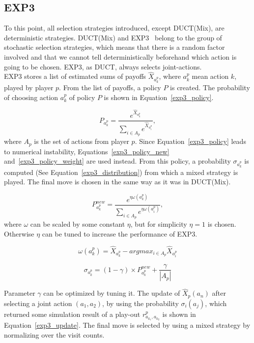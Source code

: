 \documentclass{article}
\begin{document}
\subsection{EXP3}
\label{subsec:exp3}
To this point, all selection strategies introduced, except DUCT(Mix), are deterministic strategies. DUCT(Mix) and EXP3~\cite{Teytaud11Upper} belong to the group of stochastic selection strategies, which means that there is a random factor involved and that we cannot tell deterministically beforehand which action is going to be chosen. EXP3, as DUCT, always selects joint-actions.\\
EXP3 stores a list of estimated sums of payoffs $\hat{X}_{a^{p}_{k}}$, where $a^{p}_{k}$ mean action $k$, played by player $p$. From the list of payoffs, a policy $P$ is created. The probability of choosing action $a^{p}_{k}$ of policy $P$ is shown in Equation~\ref{exp3_policy}.

\begin{equation}\label{exp3_policy}
P_{a^{p}_{k}}=\frac{e^{\hat{X}_{a^{p}_{k}}}}{\sum\limits_{i \in A_{p}}e^{\hat{X}_{a^{p}_{i}}}},
\end{equation}
where $A_{p}$ is the set of actions from player $p$. Since Equation~\ref{exp3_policy} leads to numerical instability, Equations~\ref{exp3_policy_new} and~\ref{exp3_policy_weight} are used instead. From this policy, a probability $\sigma_{a^{p}_{k}}$ is computed (See Equation~\ref{exp3_distribution}) from which a mixed strategy is played. The final move is chosen in the same way as it was in DUCT(Mix).

\begin{equation}\label{exp3_policy_new}
P^{new}_{a^{p}_{k}}=\frac{e^{\eta\omega(a^{p}_{k})}}{\sum\limits_{i \in A_{p}}e^{\eta\omega(a^{p}_{i})}},
\end{equation}
where $\omega$ can be scaled by some constant $\eta$, but for simplicity $\eta=1$ is chosen. Otherwise $\eta$ can be tuned to increase the performance of EXP3.


\begin{equation}\label{exp3_policy_weight}
\omega(a^{p}_{k})=\hat{X}_{a^{p}_{k}}-argmax_{i \in A_{p}}\hat{X}_{a^{p}_{i}}
\end{equation}

\begin{equation}\label{exp3_distribution}
\sigma_{a^{p}_{k}}=(1-\gamma) \times P^{new}_{a^{p}_{k}} + \frac{\gamma}{|A_{p}|}
\end{equation}

Parameter $\gamma$ can be optimized by tuning it. The update of $\hat{X}_{p}(a_{n})$ after selecting a joint action $(a_{1},a_{2})$, by using the probability $\sigma_{i}(a_{j})$, which returned some simulation result of a play-out $r^{p}_{a_{k_{1}},a_{k_{2}}}$ is shown in Equation~\ref{exp3_update}. The final move is selected by using a mixed strategy by normalizing over the visit counts.
\end{document}
